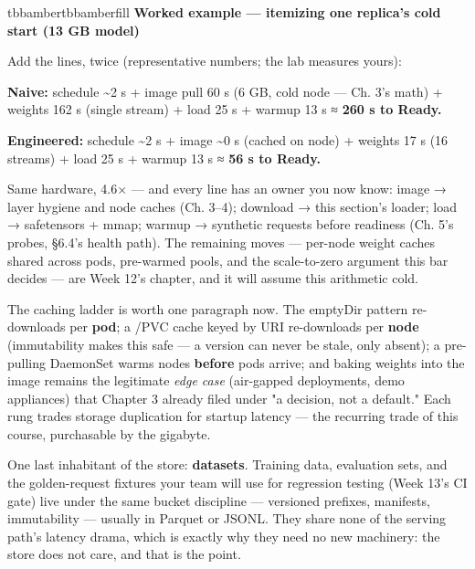 \begin{calloutbox}{tbbamber}{tbbamberfill}
{\normalsize\bfseries\color{tbbamberdark}Worked example — itemizing one replica's cold start (13 GB model)}\par\vspace{3pt}
Add the lines, twice (representative numbers; the lab measures yours):

\begin{tbbitemize}
  \item \textbf{Naive:} schedule \textasciitilde{}2 s + image pull 60 s (6 GB, cold node — Ch. 3's math) + weights 162 s (single stream) + load 25 s + warmup 13 s ≈ \textbf{260 s to Ready.}
  \item \textbf{Engineered:} schedule \textasciitilde{}2 s + image \textasciitilde{}0 s (cached on node) + weights 17 s (16 streams) + load 25 s + warmup 13 s ≈ \textbf{56 s to Ready.}
\end{tbbitemize}

Same hardware, 4.6× — and every line has an owner you now know: image → layer hygiene and node caches (Ch. 3–4); download → this section's loader; load → safetensors + mmap; warmup → synthetic requests before readiness (Ch. 5's probes, §6.4's health path). The remaining moves — per-node weight caches shared across pods, pre-warmed pools, and the scale-to-zero argument this bar decides — are Week 12's chapter, and it will assume this arithmetic cold.
\end{calloutbox}

\vspace{3.0pt}

The caching ladder is worth one paragraph now. The emptyDir pattern re-downloads per \textbf{pod}; a /PVC cache keyed by URI re-downloads per \textbf{node} (immutability makes this safe — a version can never be stale, only absent); a pre-pulling DaemonSet warms nodes \textbf{before} pods arrive; and baking weights into the image remains the legitimate \textit{edge case} (air-gapped deployments, demo appliances) that Chapter 3 already filed under "a decision, not a default." Each rung trades storage duplication for startup latency — the recurring trade of this course, purchasable by the gigabyte.

One last inhabitant of the store: \textbf{datasets}. Training data, evaluation sets, and the golden-request fixtures your team will use for regression testing (Week 13's CI gate) live under the same bucket discipline — versioned prefixes, manifests, immutability — usually in Parquet or JSONL. They share none of the serving path's latency drama, which is exactly why they need no new machinery: the store does not care, and that is the point.

